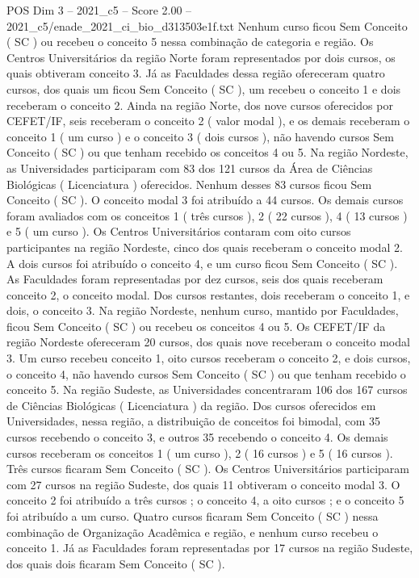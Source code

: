 \begin{textsample}{POS Dim 3 – 2021\_c5 – Score 2.00 – 2021\_c5/enade\_2021\_ci\_bio\_d313503e1f.txt}
Nenhum curso ficou Sem Conceito ( SC ) ou recebeu o conceito 5 nessa combinação de categoria e região.
Os Centros Universitários da região Norte foram representados por dois cursos, os quais obtiveram conceito 3.
Já as Faculdades dessa região ofereceram quatro cursos, dos quais um ficou Sem Conceito ( SC ), um recebeu o conceito 1 e dois receberam o conceito 2.
Ainda na região Norte, dos nove cursos oferecidos por CEFET/IF, seis receberam o conceito 2 ( valor modal ), e os demais receberam o conceito 1 ( um curso ) e o conceito 3 ( dois cursos ), não havendo cursos Sem Conceito ( SC ) ou que tenham recebido os conceitos 4 ou 5.
Na região Nordeste, as Universidades participaram com 83 dos 121 cursos da Área de Ciências Biológicas ( Licenciatura ) oferecidos.
Nenhum desses 83 cursos ficou Sem Conceito ( SC ).
O conceito modal 3 foi atribuído a 44 cursos.
Os demais cursos foram avaliados com os conceitos 1 ( três cursos ), 2 ( 22 cursos ), 4 ( 13 cursos ) e 5 ( um curso ).
Os Centros Universitários contaram com oito cursos participantes na região Nordeste, cinco dos quais receberam o conceito modal 2.
A dois cursos foi atribuído o conceito 4, e um curso ficou Sem Conceito ( SC ).
As Faculdades foram representadas por dez cursos, seis dos quais receberam conceito 2, o conceito modal.
Dos cursos restantes, dois receberam o conceito 1, e dois, o conceito 3.
Na região Nordeste, nenhum curso, mantido por Faculdades, ficou Sem Conceito ( SC ) ou recebeu os conceitos 4 ou 5.
Os CEFET/IF da região Nordeste ofereceram 20 cursos, dos quais nove receberam o conceito modal 3.
Um curso recebeu conceito 1, oito cursos receberam o conceito 2, e dois cursos, o conceito 4, não havendo cursos Sem Conceito ( SC ) ou que tenham recebido o conceito 5.
Na região Sudeste, as Universidades concentraram 106 dos 167 cursos de Ciências Biológicas ( Licenciatura ) da região.
Dos cursos oferecidos em Universidades, nessa região, a distribuição de conceitos foi bimodal, com 35 cursos recebendo o conceito 3, e outros 35 recebendo o conceito 4.
Os demais cursos receberam os conceitos 1 ( um curso ), 2 ( 16 cursos ) e 5 ( 16 cursos ).
Três cursos ficaram Sem Conceito ( SC ).
Os Centros Universitários participaram com 27 cursos na região Sudeste, dos quais 11 obtiveram o conceito modal 3.
O conceito 2 foi atribuído a três cursos ; o conceito 4, a oito cursos ; e o conceito 5 foi atribuído a um curso.
Quatro cursos ficaram Sem Conceito ( SC ) nessa combinação de Organização Acadêmica e região, e nenhum curso recebeu o conceito 1.
Já as Faculdades foram representadas por 17 cursos na região Sudeste, dos quais dois ficaram Sem Conceito ( SC ).

\end{textsample}
